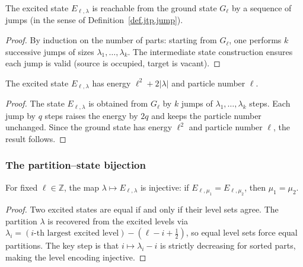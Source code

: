 \begin{lemma}
\label{lem.jtp.excitedState-reachable}
\leanhelper
\leanok
The excited state $E_{\ell,\lambda}$ is reachable from the ground state $G_\ell$
by a sequence of jumps (in the sense of Definition~\ref{def.jtp.jump}).
\end{lemma}

\begin{proof}
\leanok
By induction on the number of parts: starting from $G_\ell$, one performs $k$
successive jumps of sizes $\lambda_1, \ldots, \lambda_k$. The intermediate
state construction ensures each jump is valid (source is occupied, target is vacant).
\end{proof}

\begin{theorem}
\label{thm.jtp.excitedState-energy-parnum}
\leanhelper
\leanok
The excited state $E_{\ell,\lambda}$ has energy $\ell^{2}+2|\lambda|$ and
particle number $\ell$.
\end{theorem}

\begin{proof}
\leanok
The state $E_{\ell,\lambda}$ is obtained from $G_{\ell}$ by $k$ jumps of
$\lambda_{1},\ldots,\lambda_{k}$ steps. Each jump by $q$ steps raises the
energy by $2q$ and keeps the particle number unchanged. Since the ground
state has energy $\ell^{2}$ and particle number $\ell$, the result follows.
\end{proof}

\subsubsection{The partition--state bijection}

\begin{lemma}
\label{lem.jtp.excitedState-injective}
\leanhelper
\leanok
For fixed $\ell\in\mathbb{Z}$, the map $\lambda\mapsto E_{\ell,\lambda}$ is
injective: if $E_{\ell,\mu_1} = E_{\ell,\mu_2}$, then $\mu_1 = \mu_2$.
\end{lemma}

\begin{proof}
\leanok
Two excited states are equal if and only if their level sets agree.
The partition $\lambda$ is recovered from the excited levels via
$\lambda_i = (\text{$i$-th largest excited level}) - (\ell - i + \frac{1}{2})$,
so equal level sets force equal partitions. The key step is that
$i\mapsto \lambda_i - i$ is strictly decreasing for sorted parts,
making the level encoding injective.
\end{proof}

